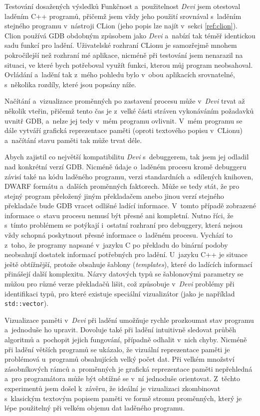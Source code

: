 \documentclass[czech,bachelor,male,python,dept460,hidelinks]{diploma}						%
\newcommand{\parspace}[1][]{
	\ifthenelse{\isempty{#1}}{\vspace{0mm}}{\vspace{#1}}
	\par
}
\begin{document}
\begin{section}{Testování dosažených výsledků}
	Funkčnost a~použitelnost \textit{Devi} jsem otestoval laděním C++ programů, přičemž jsem vždy jeho použití srovnával s~laděním stejného programu v~nástroji
	CLion (jeho popis lze najít v~sekci \ref{ref:clion}). Clion používá GDB obdobným způsobem jako \textit{Devi} a~nabízí tak téměř identickou sadu funkcí
	pro ladění. Uživatelské rozhraní CLionu je samozřejmě mnohem pokročilejší než rozhraní mé aplikace, nicméně při testování jsem nenarazil na situaci,
	ve které bych potřeboval využít funkci, kterou můj program neobsahoval. Ovládání a~ladění tak z~mého pohledu bylo v~obou aplikacích srovnatelné,
	s~několika rozdíly, které jsou popsány níže.

	\parspace Načítání a~vizualizace proměnných po zastavení procesu může v~\textit{Devi} trvat až několik vteřin, přičemž tento čas je z~velké části stráven
	vykonáváním požadavků uvnitř GDB, a~nelze jej tedy v~mém programu ovlivnit. V~mém programu se dále vytváří grafická reprezentace paměti
	(oproti textového popisu v~CLionu) a~načítání stavu paměti tak může trvat déle.
	
	\parspace Abych zajistil co největší kompatibilitu \textit{Devi} s~debuggerem, tak jsem jej odladil nad konkrétní verzí GDB. Nicméně údaje o~laděném procesu kromě
	debuggeru závisí také na kódu laděného programu, verzi standardních a~sdílených knihoven, DWARF formátu a~dalších proměnných faktorech.
	Může se tedy stát, že pro stejný program přeložený jiným překladačem anebo jinou verzí stejného překladače bude GDB vracet odlišné ladící informace.
	V~tomto případě zobrazené informace o~stavu procesu nemusí být přesné ani kompletní. Nutno říci, že s~tímto problémem
	se potýkají i~ostatní rozhraní pro debuggery, která nejsou vždy schopná poskytnout přesné informace o~laděném procesu. Vychází to z~toho,
	že programy napsané v~jazyku C po překladu do binární podoby neobsahují dostatek informací potřebných pro ladění. U~jazyku C++ je situace ještě
	obtížnější, protože obsahuje šablony (\textit{templates}), které do ladících informací přinášejí další komplexitu. Názvy datových typů se šablonovými
	parametry se můžou pro různé verze překladačů lišit, což způsobuje v~\textit{Devi} problémy při identifikaci typů, pro které existuje speciální vizualizátor
	(jako je například \texttt{std::vector}).
	
	\parspace Vizualizace paměti v~\textit{Devi} při ladění umožňuje rychle prozkoumat stav programu a~jednoduše ho upravit.
	Dovoluje také při ladění intuitivně sledovat průběh algoritmů a~pochopit jejich fungování, případně odhalit v~nich chyby.
	Nicméně při ladění větších programů se ukázalo, že vizuální reprezentace paměti je problémová u~programů obsahujících velký počet dat.
	Při velkém množství zásobníkových rámců a~proměnných je grafická reprezentace paměti nepřehledná a~pro programátora může být obtížné se v~ní
	jednoduše orientovat. Z~těchto experimentů jsem došel k~závěru, že ideální je vizualizaci zkombinovat s~klasickým textovým popisem paměti ve formě
	stromu proměnných, který je lépe použitelný při velkém objemu dat laděného programu.
	

\end{section}
\end{document}
